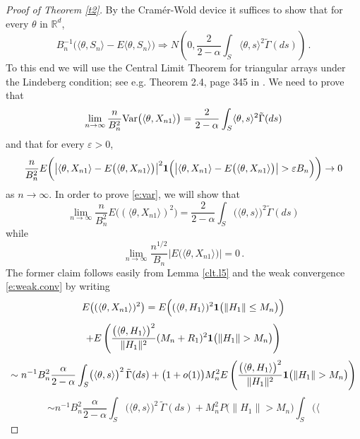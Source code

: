 \documentclass[11pt]{amsart}
\numberwithin{equation}{section}
\begin{document}
\begin{proof}[Proof of Theorem \ref{t2}] By the Cram\'er-Wold device it
suffices to show that for every $\theta$ in ${\mathbb R}^d$,
$$
B_n^{-1}\bigl(\langle \theta,S_n\rangle-E\langle
\theta,S_n\rangle\bigr)\Rightarrow
N\left(0,\frac2{2-\alpha}\int_S\langle
  \theta,s\rangle^2\tilde\Gamma(ds)\right)\,.
$$
To this end we will use the Central Limit Theorem for triangular arrays
under the Lindeberg condition; see e.g. Theorem 2.4, page 345 in
\cite{gut:2005}. We need to prove that
\begin{equation} \label{e:var}
\lim_{n\to\infty}\frac{n}{B_n^2}{{\rm Var}}\bigl(\langle
\theta,X_{n1}\rangle\bigr)  = \frac2{2-\alpha}\int_S\langle
  \theta,s\rangle^2\tilde\Gamma(ds)
\end{equation}
and that for every ${\varepsilon}>0$,
\begin{equation} \label{e:lindeberg}
 \frac{n}{B_n^2} E\biggl( \bigl| \langle
\theta,X_{n1}\rangle -
E\bigl(\langle\theta,X_{n1}\rangle\bigr)\bigr|^2
{{\bf 1}}\Bigl( \bigl| \langle\theta,X_{n1}\rangle -
E\bigl(\langle\theta,X_{n1}\rangle\bigr)\bigr|>{\varepsilon} B_n\Bigr)\biggr) \to
0
\end{equation}
as $n\to\infty$. In order to prove \eqref{e:var}, we will show that
\begin{equation} \label{e:2ndmom}
\lim_{n\to\infty}\frac{n}{B_n^2}E\bigl((\langle
\theta,X_{n1}\rangle)^2\bigr)  = \frac2{2-\alpha}\int_S\bigl(\langle
  \theta,s\rangle\bigr)^2\tilde\Gamma(ds)
\end{equation}
while
\begin{equation} \label{e:1stmom}
\lim_{n\to\infty}\frac{n^{1/2}}{B_n}\bigl|E\bigl(\langle
\theta,X_{n1}\rangle\bigr)\bigr|  = 0\,.
\end{equation}
The former claim follows easily from Lemma \ref{clt.l5} and the weak
convergence \eqref{e:weak.conv} by writing
$$
E\bigl((\langle\theta,X_{n1}\rangle)^2\bigr)  =
E\Bigl((\langle\theta,H_{1}\rangle)^2{{\bf 1}}\bigl(\|H_1\|\le
M_n\bigr)\Bigr)
$$
$$
+ E\left(
  \frac{\bigl(\langle\theta,H_{1}\rangle\bigr)^2}{\|H_1\|^2}
  (M_n+R_1)^2 {{\bf 1}}\bigl(\|H_1\|> M_n\bigr)\right)
$$
$$
\sim n^{-1}B_n^{2} \frac\alpha{2-\alpha}\int_S\bigl(\langle
  \theta,s\rangle\bigr)^2\, \tilde\Gamma(ds)
+ \bigl( 1+o(1)\bigr) M_n^2  E\left(
  \frac{\bigl(\langle\theta,H_{1}\rangle\bigr)^2}{\|H_1\|^2}
{{\bf 1}}\bigl(\|H_1\|> M_n\bigr)\right)
$$
$$
\sim n^{-1}B_n^{2} \frac\alpha{2-\alpha}\int_S\bigl(\langle
  \theta,s\rangle\bigr)^2\, \tilde\Gamma(ds)
+ M_n^2P\bigl(\|H_1\|> M_n\bigr) \int_S\bigl(\langle
$$
\end{proof}
\end{document}
